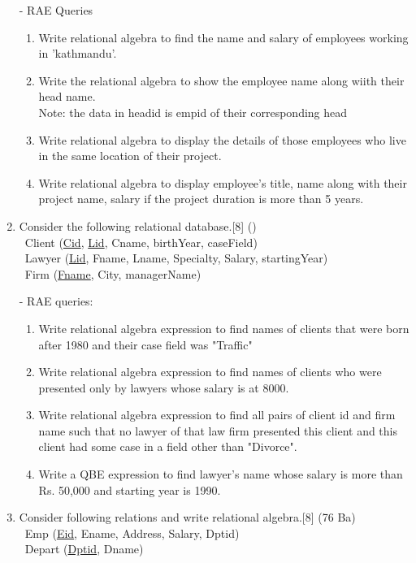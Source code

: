 \documentclass[12pt]{article}
\newcommand{\enter}{\\\textcolor{white}{1}}
\begin{document}
\begin{enumerate}
        - RAE Queries 
        \begin{enumerate}[noitemsep, topsep = 0pt, label = \alph*.]
            \item Write relational algebra to find the name and salary of employees working in 'kathmandu'.
            \item Write the relational algebra to show the employee name along wiith their head name.\\
            Note: the data in headid is empid of their corresponding head
            \item Write relational algebra to display the details of those employees who live in the same location of their project.
            \item Write relational algebra to display employee's title, name along with their project name, salary if the project duration is more than 5 years.
        \end{enumerate}

    \item Consider the following relational database.\hfill[8] ()
        \enter Client (\underline{Cid}, \underline{Lid}, Cname, birthYear, caseField)
        \enter Lawyer (\underline{Lid}, Fname, Lname, Specialty, Salary, startingYear)
        \enter Firm (\underline{Fname}, City, managerName)
        
        - RAE queries: 
        \begin{enumerate}[noitemsep, topsep = 0pt, label = \alph*.]
            \item Write relational algebra expression to find names of clients that were born after 1980 and their case field was "Traffic"
            \item Write relational algebra expression to find names of clients who were presented only by lawyers whose salary is at 8000.
            \item Write relational algebra expression to find all pairs of client id and firm name such that no lawyer of that law firm presented this client and this client had some case in a field other than "Divorce".
            \item Write a QBE expression to find lawyer's name whose salary is more than Rs. 50,000 and starting year is 1990.
        \end{enumerate}

    \item Consider following relations and write relational algebra.\hfill[8] (76 Ba)
        \enter Emp (\underline{Eid}, Ename, Address, Salary, Dptid)
        \enter Depart (\underline{Dptid}, Dname)
        

\end{enumerate}
\end{document}
